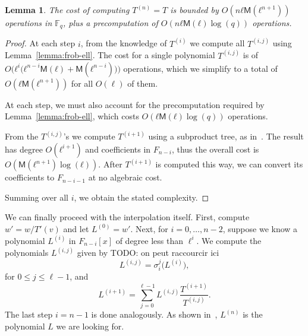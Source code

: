 \documentclass{lms}
\newcommand{\todo}[1]{{\color{red}TODO: #1}}
\newtheorem{lem}[thm]{Lemma}
\def\cout#1{\mathsf{#1}}
\newcommand{\F}{\mathbb{F}}
\newcommand{\MM}{\cout{M}}
\begin{document}
\begin{lem}\label{lemma:interpolation:minpoly}
  The cost of computing $T^{(n)}=T$ is bounded by $O(nℓ\MM(ℓ^{n+1}))$
  operations in $\F_q$, plus a precomputation of $O(nℓ\MM(ℓ)\log(q))$
  operations.
\end{lem}

\begin{proof}
  At each step $i$, from the knowledge of $T^{(i)}$ we compute all
  $T^{(i,j)}$ using Lemma~\ref{lemma:frob-ell}. The cost for a single
  polynomial $T^{(i,j)}$ is of
  $O\bigl(ℓ^i\bigl(ℓ^{n-i}\MM(ℓ)+\MM(ℓ^{n-i})\bigr)\bigr)$ operations,
  which we simplify to a total of $O(ℓ\MM(ℓ^{n+1}))$ for all $O(\ell)$
  of them.

  At each step, we must also account for the precomputation required
  by Lemma~\ref{lemma:frob-ell}, which costs $O(ℓ\MM(ℓ)\log(q))$
  operations.

  From the $T^{(i,j)}$'s we compute $T^{(i+1)}$ using a subproduct
  tree, as in~\cite[Lemma~10.4]{vzGG}. The result has degree
  $O(ℓ^{i+1})$ and coefficients in $F_{n-i}$, thus the overall cost is
  $O(\MM(ℓ^{n+1})\log(ℓ))$. After $T^{(i+1)}$ is computed this way, we
  can convert its coefficients to $F_{n-i-1}$ at no algebraic cost.

  Summing over all $i$, we obtain the stated complexity.
\end{proof}

We can finally proceed with the interpolation itself. First, compute
$w' = w/T'(v)$ and let $L^{(0)}=w'$.  Next, for $i=0,\dots,n-2$,
suppose we know a polynomial $L^{(i)}$ in $F_{n-i}[x]$ of degree less
than $\ell^i$. We compute the polynomials $L^{(i,j)}$ given by
\todo{on peut raccourcir ici}
$$L^{(i,j)}= \sigma_i^j\bigl(L^{(i)}\bigr),$$
for $0 \le j \le \ell-1$, and
$$L^{(i+1)} = \sum_{j=0}^{\ell-1} L^{(i,j)}\frac{T^{(i+1)}}{T^{(i,j)}}.$$ The last step $i=n-1$
is done analogously.  As shown in~\cite{df10}, $L^{(n)}$ is the
polynomial $L$ we are looking for.
\end{document}
